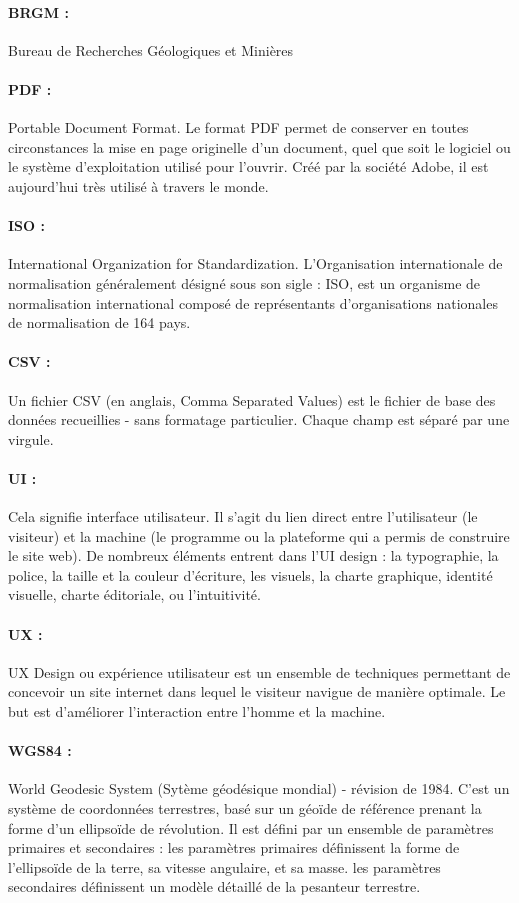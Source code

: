 \paragraph{BRGM :}
Bureau de Recherches Géologiques et Minières


\paragraph{PDF :}
Portable Document Format. Le format PDF permet de conserver en 
toutes circonstances la mise en page 
originelle d'un document, quel que soit le logiciel ou le système 
d'exploitation utilisé pour l'ouvrir. Créé par la société Adobe, 
il est aujourd'hui très utilisé à travers le monde.

\paragraph{ISO :}
International Organization for Standardization.
L'Organisation internationale de normalisation généralement désigné sous son
 sigle : ISO, est un organisme de normalisation international composé de 
 représentants d'organisations nationales de normalisation de 164 pays.


\paragraph{CSV :}
Un fichier CSV (en anglais, Comma Separated Values) est le fichier de 
base des données recueillies - sans formatage particulier. Chaque 
champ est séparé par une virgule.

\paragraph{UI :}
Cela signifie interface 
utilisateur. Il s’agit du lien direct entre l’utilisateur (le visiteur) 
et la machine (le programme ou la plateforme qui a permis de construire 
le site web). De nombreux éléments entrent dans l’UI design : la typographie, la police, la taille et la 
couleur d’écriture, les visuels, la charte graphique, identité visuelle, 
charte éditoriale, ou l’intuitivité.

\paragraph{UX :}
UX Design ou expérience utilisateur est un ensemble de techniques 
permettant de concevoir un site internet dans lequel le visiteur navigue 
de manière optimale. Le but est d’améliorer l’interaction entre l’homme 
et la machine. 

\paragraph{WGS84 :}
World Geodesic System (Sytème géodésique mondial) - révision de 1984.
C'est un système de coordonnées terrestres, basé sur un géoïde de référence 
prenant la forme d'un ellipsoïde de révolution. Il est 
défini par un ensemble de paramètres primaires et secondaires :
les paramètres primaires définissent la forme de l'ellipsoïde de la terre, sa vitesse angulaire, et sa masse.
les paramètres secondaires définissent un modèle détaillé de la pesanteur terrestre.
